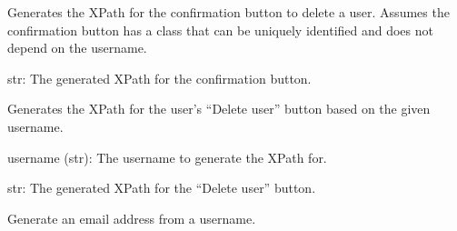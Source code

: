 \documentclass[letterpaper,10pt,english]{sphinxmanual}
\begin{document}

\begin{fulllineitems}
\label{\detokenize{utils:utils.user_management.generate_confirm_delete_user_button_xpath}}
\pysigstartsignatures
{}
\pysigstopsignatures
\sphinxAtStartPar
Generates the XPath for the confirmation button to delete a user. Assumes
the confirmation button has a class that can be uniquely identified and does not depend on the username.
\begin{description}
\sphinxAtStartPar
str: The generated XPath for the confirmation button.

\end{description}

\end{fulllineitems}


\begin{fulllineitems}
\label{\detokenize{utils:utils.user_management.generate_delete_user_button_xpath}}
\pysigstartsignatures
{}
\pysigstopsignatures
\sphinxAtStartPar
Generates the XPath for the user’s “Delete user” button based on the given username.
\begin{description}
\sphinxAtStartPar
username (str): The username to generate the XPath for.

\sphinxAtStartPar
str: The generated XPath for the “Delete user” button.

\end{description}

\end{fulllineitems}


\begin{fulllineitems}
\label{\detokenize{utils:utils.user_management.generate_email}}
\pysigstartsignatures
{}
\pysigstopsignatures
\sphinxAtStartPar
Generate an email address from a username.

\end{fulllineitems}
\end{document}
